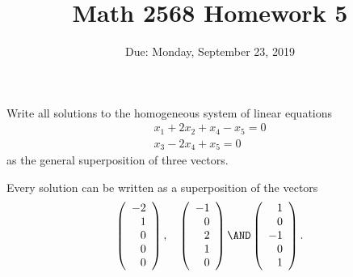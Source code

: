 \documentclass{article}
\title{Math 2568 Homework 5}
\author{\phantom{Dr. Golubitsky}}
\date{Due: Monday, September 23, 2019}
\begin{document}
\maketitle


\problemlabel



\begin{exercise} \label{c4.4.2}
Write all solutions to the homogeneous system of linear
equations
\begin{eqnarray*}
x_1+2x_2+x_4-x_5 = 0\\
x_3-2x_4+x_5 = 0
\end{eqnarray*}
as the general superposition of three vectors.

\begin{solution}

\ans Every solution can be written as a superposition of the vectors
\[
\left(\begin{array}{r} -2 \\ 1 \\ 0 \\ 0 \\ 0\end{array}\right), \quad
\left(\begin{array}{r} -1 \\ 0 \\ 2 \\ 1 \\ 0 \end{array}\right) \AND
\left(\begin{array}{r} 1 \\ 0 \\ -1 \\ 0 \\ 1 \end{array}\right).
\]


\end{solution}
\end{exercise}
\end{document}
